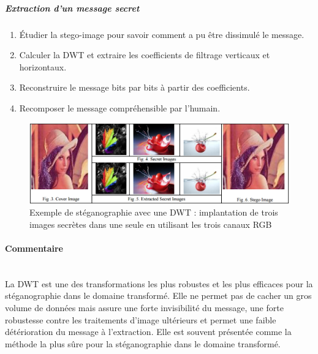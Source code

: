 \subparagraph{Extraction d'un message secret}
\begin{enumerate}
\item Étudier la stego-image pour savoir comment a pu être dissimulé le message.
\item Calculer la DWT et extraire les coefficients de filtrage verticaux et horizontaux.
\item Reconstruire le message bits par bits à partir des coefficients.
\item Recomposer le message compréhensible par l'humain.
\end{enumerate}

\begin{figure}[h]
	\includegraphics[width=\linewidth]{images/dwt-stego-exemple.png}
	\centering \caption{Exemple de stéganographie avec une DWT : implantation de trois images secrètes dans une seule en utilisant les trois canaux RGB\cite{DWT-RGB}}
\end{figure}

\paragraph{Commentaire}~\\\indent
La DWT est une des transformations les plus robustes et les plus efficaces pour la stéganographie dans le domaine transformé. Elle ne permet pas de cacher un gros volume de données mais assure une forte invisibilité du message, une forte robustesse contre les traitements d'image ultérieurs et permet une faible détérioration du message à l'extraction. Elle est souvent présentée comme la méthode la plus sûre pour la stéganographie dans le domaine transformé.